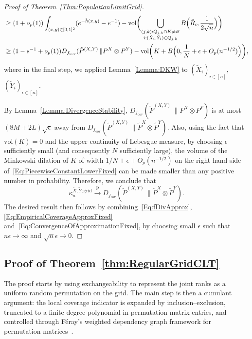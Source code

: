 \documentclass[11pt]{article}
\newcommand{\vol}{\mathrm{vol}}
\newcommand{\pto}{\xrightarrow{\,\mathrm{p}\,} }
\begin{document}
\begin{proof}[Proof of Theorem~\ref{Thm:PopulationLimitGrid}]
\begin{align}
    &\geq (1+o_p(1))\int_{(x,y)\in[0,1]^2} (e^{-\tilde h(x,y)}-e^{-1}) - \vol\biggl(\bigcup_{\substack{(j,k):Q_{j,k}\cap K\neq\varnothing\\ i:(\tilde X_i,\tilde Y_i)\in Q_{j,k}}} B\Bigl(\tilde R_i,\frac{1}{2\sqrt{n}}\Bigr)\biggr)\nonumber\\
    &\geq (1-e^{-1}+o_p(1))D_{f_{\mathrm{cov}}}(\tilde P^{(X,Y)}\,\| P^X\otimes P^Y) - \vol\biggl(K + B\Bigl(0,  \frac{1}{N} + \epsilon + O_p(n^{-1/2})\Bigr)\biggr),\label{Eq:PiecewiseConstantLowerFixed}
\end{align}
where in the final step, we applied Lemma~\ref{Lemma:DKW} to $(\tilde X_i)_{i\in[n]}$, $(\tilde Y_i)_{i\in[n]}$. 

By Lemma~\ref{Lemma:DivergenceStability}, $D_{f_{\mathrm{cov}}}(\tilde P^{(X,Y)}\,\| P^X\otimes P^Y)$ is at most $(8M+2L)\sqrt{\epsilon}$ away from $D_{f_{\mathrm{cov}}}(\tilde P^{(X,Y)}\,\| \tilde P^X\otimes \tilde P^Y)$. Also, using the fact that $\vol(K)=0$ and the upper continuity of Lebesgue measure, by choosing $\epsilon$ sufficiently small (and consequently $N$ sufficiently large), the volume of the Minkowski dilation of $K$ of width $1/N+\epsilon+O_p(n^{-1/2})$ on the right-hand side of~\eqref{Eq:PiecewiseConstantLowerFixed} can be made smaller than any positive number in probability. Therefore, we conclude that
\begin{equation}
\label{Eq:ConvergenceOfApproximationFixed}
\kappa_n^{\tilde X,\tilde Y; \mathrm{grid}} \pto D_{f_{\mathrm{cov}}}(\tilde P^{(X,Y)}\,\| \tilde P^X\otimes \tilde P^Y).
\end{equation}
The desired result then follows by combining~\eqref{Eq:fDivApprox}, \eqref{Eq:EmpiricalCoverageApproxFixed} and~\eqref{Eq:ConvergenceOfApproximationFixed}, by choosing small $\epsilon$ such that $n\epsilon\to\infty$ and $\sqrt{n}\epsilon\to 0$.
\end{proof}

\subsection{Proof of Theorem~\ref{thm:RegularGridCLT}}

The proof starts by using exchangeability to represent the joint ranks as a uniform random permutation on the grid. The main step is then a cumulant argument: the local coverage indicator is expanded by inclusion--exclusion, truncated to a finite-degree polynomial in permutation-matrix entries, and controlled through F\'eray's weighted dependency graph framework for permutation matrices~\citep{Feray2018WeightedDG}. 
\end{document}
